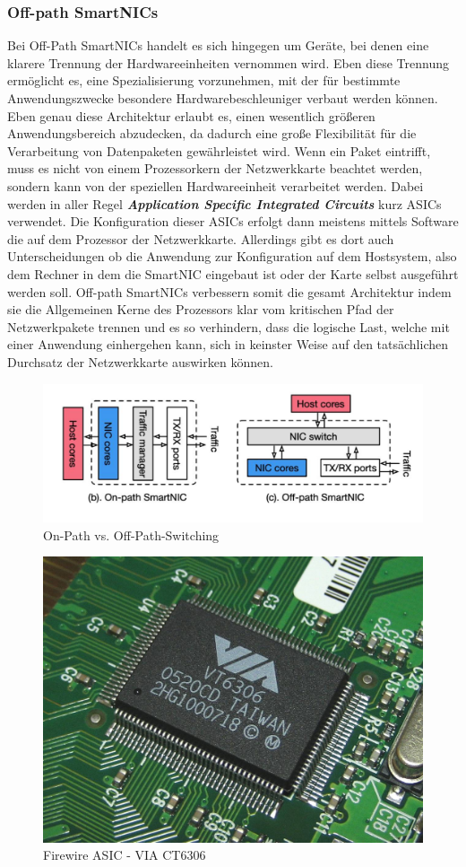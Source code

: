 \subsubsection{Off-path SmartNICs}
Bei Off-Path SmartNICs handelt es sich hingegen um Geräte, bei denen eine klarere Trennung der Hardwareeinheiten vernommen wird. Eben diese Trennung ermöglicht es, eine Spezialisierung vorzunehmen, mit der für bestimmte Anwendungszwecke besondere Hardwarebeschleuniger verbaut werden können. Eben genau diese Architektur erlaubt es, einen wesentlich größeren Anwendungsbereich abzudecken, da dadurch eine große Flexibilität für die Verarbeitung von Datenpaketen gewährleistet wird. Wenn ein Paket eintrifft, muss es nicht von einem Prozessorkern der Netzwerkkarte beachtet werden, sondern kann von der speziellen Hardwareeinheit verarbeitet werden. Dabei werden in aller Regel \textbf{\textit{Application Specific Integrated Circuits}} kurz ASICs verwendet. Die Konfiguration dieser ASICs erfolgt dann meistens mittels Software die auf dem Prozessor der Netzwerkkarte. Allerdings gibt es dort auch Unterscheidungen ob die Anwendung zur Konfiguration auf dem Hostsystem, also dem Rechner in dem die SmartNIC eingebaut ist oder der Karte selbst ausgeführt werden soll. Off-path SmartNICs verbessern somit die gesamt Architektur indem sie die Allgemeinen Kerne des Prozessors klar vom kritischen Pfad der Netzwerkpakete trennen und es so verhindern, dass die logische Last, welche mit einer Anwendung einhergehen kann, sich in keinster Weise auf den tatsächlichen Durchsatz der Netzwerkkarte auswirken können.
\begin{figure}
    \centering
    \includegraphics[width=0.9\linewidth]{images/Screenshot 2025-03-16 at 10-41-14 Netdev 0x14 -- Taking Control of your SmartNIC v1.pdf.png}
    \caption{On-Path vs. Off-Path-Switching}
    \label{fig:enter-label}
\end{figure}
\begin{figure}
    \centering
    \includegraphics[width=0.5\linewidth]{images/Buffalo_IFC-ILP4_VIA_VT6306.jpg}
    \caption{Firewire ASIC - VIA CT6306}
    \label{fig:enter-label}
\end{figure}
